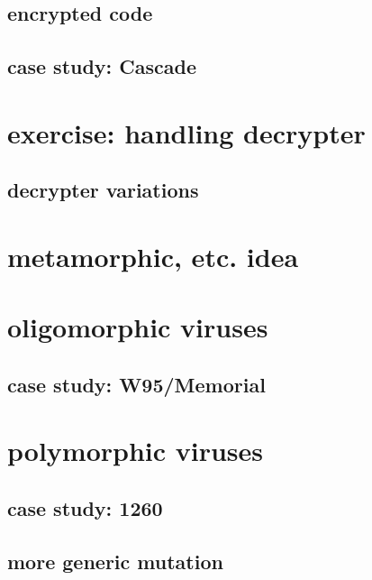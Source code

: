 \subsection{encrypted code}



\subsection{case study: Cascade}


\section{exercise: handling decrypter}



\subsection{decrypter variations}


\section{metamorphic, etc. idea}


\section{oligomorphic viruses}


\subsection{case study: W95/Memorial}


\section{polymorphic viruses}


\subsection{case study: 1260}


\subsection{more generic mutation}


